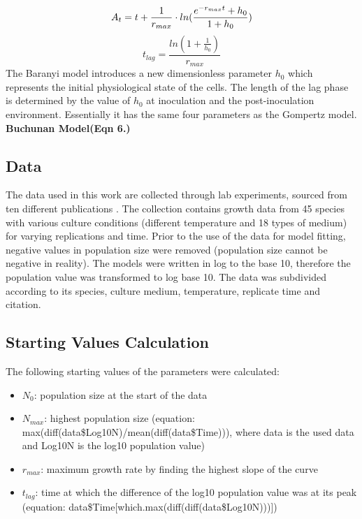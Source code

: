 \documentclass[a4paper,11pt]{article}
\theoremstyle{definition}
\begin{document}
\begin{equation}
    A_t = t + \frac{1}{r_{max}}\cdot ln(\frac{e^{-r_{max}t}+h_0}{1+h_0})\\
\end{equation}
\begin{equation}
    t_{lag} = \frac{ln(1+\frac{1}{h_0})}{r_{max}}
\end{equation}
The Baranyi model introduces a new dimensionless parameter $h_0$ which represents the initial physiological state of the cells. The length of the lag phase is determined by the value of $h_0$ at inoculation and the post-inoculation environment. Essentially it has the same four parameters as the Gompertz model.\\
\textbf{Buchunan Model(Eqn 6.)}

\subsection{Data}
The data used in this work are collected through lab experiments, sourced from ten different publications \citep{bae2014growth,bernhardt2018metabolic,galarz2016predicting,gill1991growth,phillips1987relation,roth1962continuity,silva2018modelling,sivonen1990effects, stannard1985temperature,zwietering1994modeling}. The collection contains growth data from 45 species with various culture conditions (different temperature and 18 types of medium) for varying replications and time. Prior to the use of the data for model fitting, negative values in population size were removed (population size cannot be negative in reality). The models were written in log to the base 10, therefore the population value was transformed to log base 10. The data was subdivided according to its species, culture medium, temperature, replicate time and citation.

\subsection{Starting Values Calculation}
The following starting values of the parameters were calculated:
\begin{itemize}
	\item $N_0$: population size at the start of the data
    \item $N_{max}$: highest population size (equation: max(diff(data\$Log10N)/mean(diff(data\$Time))), where data is the used data and Log10N is the log10 population value)
    \item $r_{max}$: maximum growth rate by finding the highest slope of the curve
	\item $t_{lag}$: time at which the difference of the log10 population value was at its peak (equation: data\$Time[which.max(diff(diff(data\$Log10N)))])
\end{itemize}
\end{document}
